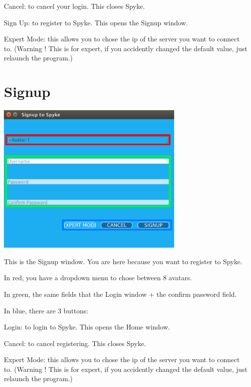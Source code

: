 \documentclass{article}
\begin{document}
  Cancel: to cancel your login. This closes Spyke.

  Sign Up: to register to Spyke. This opens the Signup window.

  Expert Mode: this allows you to chose the ip of the server you want to connect to. (Warning ! This is for expert, if you accidently changed the default value, just relaunch the program.)

  \newpage

  \section{Signup}
  \bigskip
  \includegraphics[width=350]{signupGuide}

  \bigskip
  This is the Signup window. You are here because you want to register to Spyke.

  \bigskip
  In red, you have a dropdown menu to chose between 8 avatars.

  \bigskip
  In green, the same fields that the Login window + the confirm password field.

  \bigskip
  In blue, there are 3 buttons:

  Login: to login to Spyke. This opens the Home window.

  Cancel: to cancel registering. This closes Spyke.

  Expert Mode: this allows you to chose the ip of the server you want to connect to. (Warning ! This is for expert, if you accidently changed the default value, just relaunch the program.)
\end{document}
